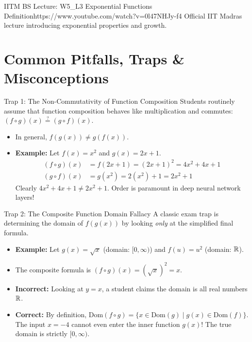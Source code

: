 \begin{videocard}{IITM BS Lecture: W5\_L3 Exponential Functions Definition}{https://www.youtube.com/watch?v=0l47NHJy-f4}
Official IIT Madras lecture introducing exponential properties and growth.
\end{videocard}

\section{Common Pitfalls, Traps \& Misconceptions}

\begin{trapbox}{Trap 1: The Non-Commutativity of Function Composition}
Students routinely assume that function composition behaves like multiplication and commutes: $(f \circ g)(x) \stackrel{?}{=} (g \circ f)(x)$.
\begin{itemize}
    \item In general, $f(g(x)) \neq g(f(x))$.
    \item \textbf{Example:} Let $f(x) = x^2$ and $g(x) = 2x + 1$.
    \begin{align*}
        (f \circ g)(x) &= f(2x + 1) = (2x + 1)^2 = 4x^2 + 4x + 1 \\
        (g \circ f)(x) &= g(x^2) = 2(x^2) + 1 = 2x^2 + 1
    \end{align*}
    Clearly $4x^2 + 4x + 1 \neq 2x^2 + 1$. Order is paramount in deep neural network layers!
\end{itemize}
\end{trapbox}

\begin{trapbox}{Trap 2: The Composite Function Domain Fallacy}
A classic exam trap is determining the domain of $f(g(x))$ by looking \textit{only} at the simplified final formula.
\begin{itemize}
    \item \textbf{Example:} Let $g(x) = \sqrt{x}$ (domain: $[0, \infty)$) and $f(u) = u^2$ (domain: $\mathbb{R}$).
    \item The composite formula is $(f \circ g)(x) = (\sqrt{x})^2 = x$.
    \item \textbf{Incorrect:} Looking at $y = x$, a student claims the domain is all real numbers $\mathbb{R}$.
    \item \textbf{Correct:} By definition, $\text{Dom}(f \circ g) = \{x \in \text{Dom}(g) \mid g(x) \in \text{Dom}(f)\}$. The input $x = -4$ cannot even enter the inner function $g(x)$! The true domain is strictly $[0, \infty)$.
\end{itemize}
\end{trapbox}

